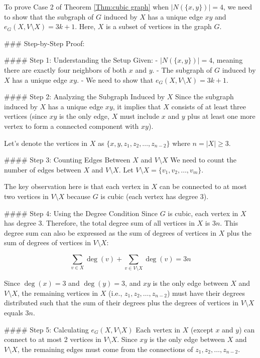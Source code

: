 To prove Case 2 of Theorem \ref{Thm:cubic graph} when \( |N(\{x, y\})| = 4 \), we need to show that the subgraph of \( G \) induced by \( X \) has a unique edge \( xy \) and \( e_G(X, V \setminus X) = 3k + 1 \). Here, \( X \) is a subset of vertices in the graph \( G \).

### Step-by-Step Proof:

#### Step 1: Understanding the Setup
Given:
- \( |N(\{x, y\})| = 4 \), meaning there are exactly four neighbors of both \( x \) and \( y \).
- The subgraph of \( G \) induced by \( X \) has a unique edge \( xy \).
- We need to show that \( e_G(X, V \setminus X) = 3k + 1 \).

#### Step 2: Analyzing the Subgraph Induced by \( X \)
Since the subgraph induced by \( X \) has a unique edge \( xy \), it implies that \( X \) consists of at least three vertices (since \( xy \) is the only edge, \( X \) must include \( x \) and \( y \) plus at least one more vertex to form a connected component with \( xy \)).

Let's denote the vertices in \( X \) as \( \{x, y, z_1, z_2, \ldots, z_{n-2}\} \) where \( n = |X| \geq 3 \).

#### Step 3: Counting Edges Between \( X \) and \( V \setminus X \)
We need to count the number of edges between \( X \) and \( V \setminus X \). Let \( V \setminus X = \{v_1, v_2, \ldots, v_m\} \).

The key observation here is that each vertex in \( X \) can be connected to at most two vertices in \( V \setminus X \) because \( G \) is cubic (each vertex has degree 3).

#### Step 4: Using the Degree Condition
Since \( G \) is cubic, each vertex in \( X \) has degree 3. Therefore, the total degree sum of all vertices in \( X \) is \( 3n \). This degree sum can also be expressed as the sum of degrees of vertices in \( X \) plus the sum of degrees of vertices in \( V \setminus X \):

\[
\sum_{v \in X} \deg(v) + \sum_{v \in V \setminus X} \deg(v) = 3n
\]

Since \( \deg(x) = 3 \) and \( \deg(y) = 3 \), and \( xy \) is the only edge between \( X \) and \( V \setminus X \), the remaining vertices in \( X \) (i.e., \( z_1, z_2, \ldots, z_{n-2} \)) must have their degrees distributed such that the sum of their degrees plus the degrees of vertices in \( V \setminus X \) equals \( 3n \).

#### Step 5: Calculating \( e_G(X, V \setminus X) \)
Each vertex in \( X \) (except \( x \) and \( y \)) can connect to at most 2 vertices in \( V \setminus X \). Since \( xy \) is the only edge between \( X \) and \( V \setminus X \), the remaining edges must come from the connections of \( z_1, z_2, \ldots, z_{n-2} \).


